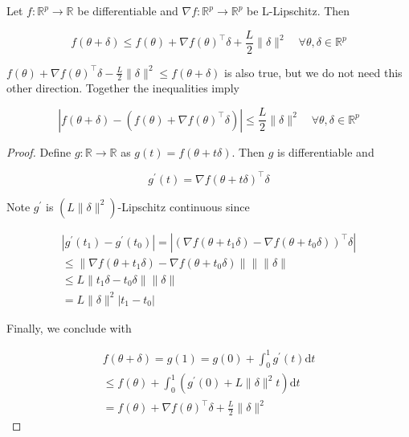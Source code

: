 \documentclass{report}
\begin{document}
\begin{theorem}
    Let $f: \mathbb{R}^{p} \rightarrow \mathbb{R}$ be differentiable and $\nabla f: \mathbb{R}^{p} \rightarrow \mathbb{R}^{p}$ be L-Lipschitz. Then

    $$
    f(\theta+\delta) \leq f(\theta)+\nabla f(\theta)^{\top} \delta+\frac{L}{2}\|\delta\|^{2} \quad \forall \theta, \delta \in \mathbb{R}^{p}
    $$

    \par\noindent\textcolor{gray}{\hdashrule{\textwidth}{0.4pt}{1pt 2pt}}

    $f(\theta)+\nabla f(\theta)^{\top} \delta-\frac{L}{2}\|\delta\|^{2} \leq f(\theta+\delta)$ is also true, but we do not need this other direction. Together the inequalities imply

    $$
    \left|f(\theta+\delta)-\left(f(\theta)+\nabla f(\theta)^{\top} \delta\right)\right| \leq \frac{L}{2}\|\delta\|^{2} \quad \forall \theta, \delta \in \mathbb{R}^{p}
    $$

    \begin{proof}
        Define $g: \mathbb{R} \rightarrow \mathbb{R}$ as $g(t)=f(\theta+t \delta)$. Then $g$ is differentiable and

        $$
        g^{\prime}(t)=\nabla f(\theta+t \delta)^{\top} \delta
        $$

        Note $g^{\prime}$ is $\left(L\|\delta\|^{2}\right)$-Lipschitz continuous since

        $$
        \begin{gathered}
        \left|g^{\prime}\left(t_{1}\right)-g^{\prime}\left(t_{0}\right)\right|=\left|\left(\nabla f\left(\theta+t_{1} \delta\right)-\nabla f\left(\theta+t_{0} \delta\right)\right)^{\top} \delta\right| \\
        \leq\left\|\nabla f\left(\theta+t_{1} \delta\right)-\nabla f\left(\theta+t_{0} \delta\right)\right\|\| \| \delta \| \\
        \leq L\left\|t_{1} \delta-t_{0} \delta\right\|\|\delta\| \\
        =L\|\delta\|^{2}\left|t_{1}-t_{0}\right|
        \end{gathered}
        $$

        Finally, we conclude with

        $$
        \begin{gathered}
        f(\theta+\delta)=g(1)=g(0)+\int_{0}^{1} g^{\prime}(t) \mathrm{d} t \\
        \leq f(\theta)+\int_{0}^{1}\left(g^{\prime}(0)+L\|\delta\|^{2} t\right) \mathrm{d} t \\
        =f(\theta)+\nabla f(\theta)^{\top} \delta+\frac{L}{2}\|\delta\|^{2}
        \end{gathered}
        $$
    \end{proof}
\end{theorem}
\end{document}
